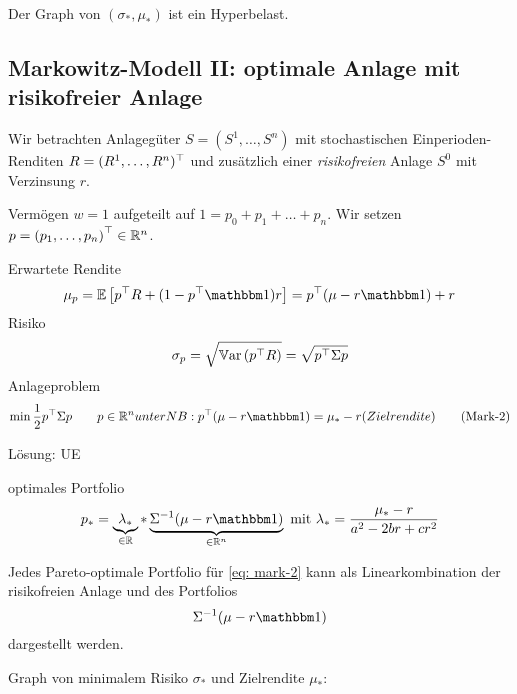 Der Graph von $(\sigma_\ast, \mu_\ast)$ ist ein Hyperbelast.

\subsection{Markowitz-Modell II: optimale Anlage mit risikofreier Anlage}
Wir betrachten Anlagegüter $S = (S^1, \dots, S^n)$ mit stochastischen Einperioden-Renditen $R=\trans{(R^1, \dots, R^n)}$ und zusätzlich einer \textit{risikofreien} Anlage $S^0$ mit Verzinsung $r$.

Vermögen $w=1$ aufgeteilt auf $1 = p_0 + p_1 + \dots + p_n$. Wir setzen $p = \transpose{p_1, \dots, p_n} \in \Rn$. 

Erwartete Rendite
\begin{equation*}
	\mu_p = \EW[\trans{p} R + (1 - \trans{p}\one) r] = \trans{p} (\mu - r \one) + r
\end{equation*}
Risiko
\begin{equation*}
	\sigma_p = \sqrt{\Var[\trans{p}R]} = \sqrt{\trans{p} \Sigma p}
\end{equation*}
Anlageproblem
\begin{equation*}
	\min \frac{1}{2} \trans{p} \Sigma p \qquad p \in \Rn unter NB: \trans{p} (\mu - r\one) = \mu_\ast - r (Zielrendite)
	\tag{Mark-2} \label{eq: mark-2}
\end{equation*}

Lösung: UE

optimales Portfolio
\begin{equation*}
	p_\ast = \underbrace{\lambda_\ast}_{\in \R} * \underbrace{\Sigma^{-1} (\mu - r \one)}_{\in \Rn} \mit \lambda_\ast = \frac{\mu_\ast - r}{a^2 - 2br + cr^2}
\end{equation*}

\begin{korollar}
	Jedes Pareto-optimale Portfolio für \eqref{eq: mark-2} kann als Linearkombination der risikofreien Anlage und des Portfolios 
	\begin{equation*}
		\Sigma^{-1} (\mu - r \one)
	\end{equation*}
	dargestellt werden.
\end{korollar}

Graph von minimalem Risiko $\sigma_\ast$ und Zielrendite $\mu_\ast$:


